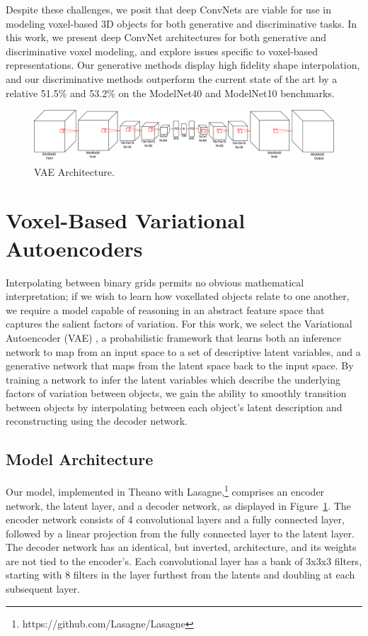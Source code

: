 \documentclass{article}
\begin{document}
Despite these challenges, we posit that deep ConvNets are viable for use in modeling voxel-based 3D objects for both generative and discriminative tasks. In this work, we present deep ConvNet architectures for both generative and discriminative voxel modeling, and explore issues specific to voxel-based representations. Our generative methods display high  fidelity shape interpolation, and our discriminative methods outperform the current state of the art by a relative 51.5\% and 53.2\% on the ModelNet40 and ModelNet10 benchmarks.

\begin{figure}[ht]
  \centering
  \includegraphics[scale=0.33]{VAEd1.pdf}
  \caption{VAE Architecture.}
  \label{VAE_arch}
\end{figure}

\section{Voxel-Based Variational Autoencoders}
\label{VAE}
Interpolating between binary grids permits no obvious mathematical interpretation; if we wish to learn how voxellated objects relate to one another, we require a model capable of reasoning in an abstract feature space that captures the salient factors of variation. For this work, we select the Variational Autoencoder (VAE) \citep{VAE}, a probabilistic framework that learns both an inference network to map from an input space to a set of descriptive latent variables, and a generative network that maps from the latent space back to the input space. By training a network to infer the latent variables which describe the underlying factors of variation between objects, we gain the ability to smoothly transition between objects by interpolating between each object's latent description and reconstructing using the decoder network.
\subsection{Model Architecture}
Our model, implemented in Theano\citep{Theano} with Lasagne,\footnote{https://github.com/Lasagne/Lasagne} comprises an encoder network, the latent layer, and a decoder network, as displayed in Figure~\ref{VAE_arch}. The encoder network consists of 4 convolutional layers and a fully connected layer, followed by a linear projection from the fully connected layer to the latent layer. The decoder network has an identical, but inverted, architecture, and its weights are not tied to the encoder's. Each convolutional layer has a bank of 3x3x3 filters, starting with 8 filters in the layer furthest from the latents and doubling at each subsequent layer. 
\end{document}
